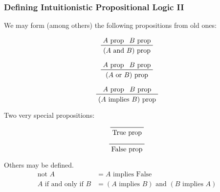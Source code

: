 \documentclass{beamer}
\begin{document}
\begin{frame}
  \frametitle{Defining Intuitionistic Propositional Logic II}
  We may form (among others) the following propositions from old ones:
  \begin{center}
    \begin{minipage}[b]{0.3\linewidth}
      \begin{displaymath}
        \prftree[r]{}{A\text{ prop}}{B\text{ prop}}
          {(A\text{ and }B)\text{ prop}}
      \end{displaymath}
    \end{minipage}
    \begin{minipage}[b]{0.3\linewidth}
      \begin{displaymath}
        \prftree[r]{}{A\text{ prop}}{B\text{ prop}}
          {(A\text{ or }B)\text{ prop}}
      \end{displaymath}
    \end{minipage}
    \begin{minipage}[b]{0.3\linewidth}
      \begin{displaymath}
        \prftree[r]{}{A\text{ prop}}{B\text{ prop}}
          {(A\text{ implies }B)\text{ prop}}
      \end{displaymath}
    \end{minipage}
  \end{center}
  Two very special propositions:
  \begin{center}
    \begin{minipage}[b]{0.4\linewidth}
      \begin{displaymath}
        \prftree[r]{}{}{\text{True prop}}
      \end{displaymath}
    \end{minipage}
    \begin{minipage}[b]{0.4\linewidth}
      \begin{displaymath}
        \prftree[r]{}{}{\text{False prop}}
      \end{displaymath}
    \end{minipage}
  \end{center}
  Others may be defined.
  \begin{align*}
    \text{not }A &= A\text{ implies False} \\
    A\text{ if and only if }B &= (A\text{ implies }B)\text{ and }(B\text{ implies }A)
  \end{align*}
\end{frame}
\end{document}
